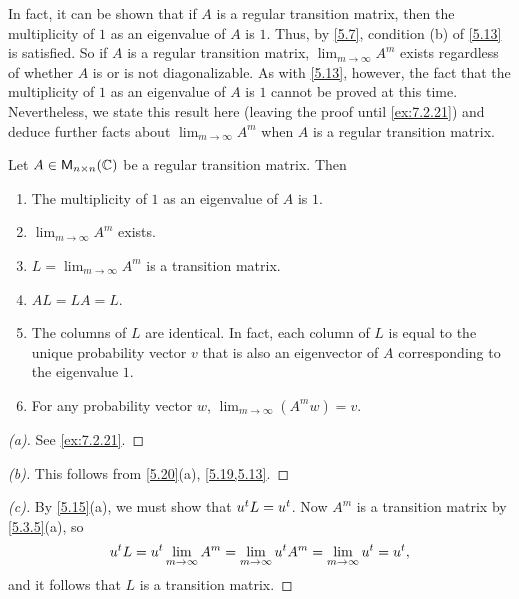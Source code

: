 \begin{note}
	In fact, it can be shown that if \(A\) is a regular transition matrix, then the multiplicity of \(1\) as an eigenvalue of \(A\) is \(1\).
	Thus, by \cref{5.7}, condition (b) of \cref{5.13} is satisfied.
	So if \(A\) is a regular transition matrix, \(\lim_{m \to \infty} A^m\) exists regardless of whether \(A\) is or is not diagonalizable.
	As with \cref{5.13}, however, the fact that the multiplicity of \(1\) as an eigenvalue of \(A\) is \(1\) cannot be proved at this time.
	Nevertheless, we state this result here (leaving the proof until \cref{ex:7.2.21}) and deduce further facts about \(\lim_{m \to \infty} A^m\) when \(A\) is a regular transition matrix.
\end{note}

\begin{thm}\label{5.20}
	Let \(A \in \mathsf{M}_{{n} \times n}({\mathbb{C}})\) be a regular transition matrix.
	Then
	\begin{enumerate}
		\item The multiplicity of \(1\) as an eigenvalue of \(A\) is \(1\).
		\item \(\lim_{m \to \infty} A^m\) exists.
		\item \(L = \lim_{m \to \infty} A^m\) is a transition matrix.
		\item \(AL = LA = L\).
		\item The columns of \(L\) are identical.
		      In fact, each column of \(L\) is equal to the unique probability vector \(v\) that is also an eigenvector of \(A\) corresponding to the eigenvalue \(1\).
		\item For any probability vector \(w\), \(\lim_{m \to \infty} (A^m w) = v\).
	\end{enumerate}
\end{thm}

\begin{proof}[(a)]
	See \cref{ex:7.2.21}.
\end{proof}

\begin{proof}[(b)]
	This follows from \cref{5.20}(a), \cref{5.19,5.13}.
\end{proof}

\begin{proof}[(c)]
	By \cref{5.15}(a), we must show that \({u}^{t} L = {u}^{t}\).
	Now \(A^m\) is a transition matrix by \cref{5.3.5}(a), so
	\[
		{u}^{t} L = {u}^{t} \lim_{m \to \infty} A^m = \lim_{m \to \infty} {u}^{t} A^m = \lim_{m \to \infty} {u}^{t} = {u}^{t},
	\]
	and it follows that \(L\) is a transition matrix.
\end{proof}

